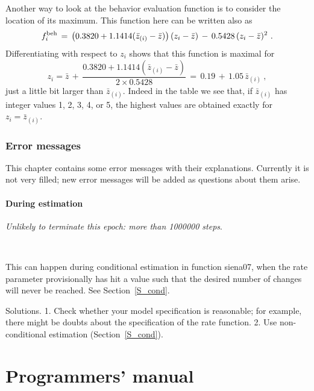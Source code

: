 \documentclass[a4paper,fleqn,11pt]{article}
\newcommand{\+}{\, + \,}
\newcommand{\sfn}[1]{\textsf{#1}}
\begin{document}
{Another way to look at the behavior evaluation function is to consider
the location of its maximum. This function here can be written also as
\[
   f^{\rm beh}_i \,=\, \big( 0.3820 +
                1.1414( \bar z_{(i)} - \bar z) \big) \, (z_i - \bar z)
       \,-\, 0.5428 \, (z_i - \bar z)^2   \ .
\]
Differentiating with respect to $z_i$ shows that
this function is maximal for
\[
   z_i = \bar z \,+\, \frac{0.3820 +
               1.1414( \bar z_{(i)} - \bar z)}{2 \times  0.5428 }
    \,=\,  0.19 \,+\, 1.05 \,  \bar z_{(i)}  \ ,
\]
just a little bit larger than $ \bar z_{(i)}$.
Indeed in the table we see that, if $ \bar z_{(i)}$
has integer values 1, 2, 3, 4, or 5,
the highest values are obtained exactly
for  $z_i = \bar z_{(i)}$.


\newpage
\section{Error messages}

This chapter contains some error messages with their explanations.
Currently it is not very filled; new error messages will be added
as questions about them arise.

\subsection{During estimation}

\emph{Unlikely to terminate this epoch: more than 1000000 steps}.\\

\begin{minipage}{0.05\textwidth}
$\phantom{abcde}$

\end{minipage}
\begin{minipage}{0.94\textwidth}
This can happen during conditional estimation in function \sfn{siena07},
when the rate parameter provisionally has hit a value such that the
desired number of changes will never be reached.
See Section~\ref{S_cond}.

\noindent
Solutions. 1. Check whether your model specification is reasonable;
for example, there might be doubts about the specification of the
rate function. 2. Use non-conditional estimation (Section~\ref{S_cond}).
\end{minipage}

\newpage
\part{Programmers' manual}

}
\end{document}
